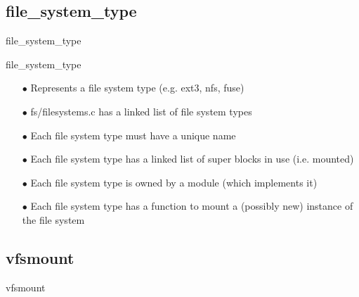 \documentclass{beamer}
\begin{document}
\subsection{file\_system\_type}

\begin{frame}{file\_system\_type}
	
	
\end{frame}

\begin{frame}{file\_system\_type}
	
	\begin{itemize}[<+->]
	
		\item[$\bullet$]{Represents a file system type (e.g. ext3, nfs, fuse)}
		\item[$\bullet$]{fs/filesystems.c has a linked list of file system types}
		\item[$\bullet$]{Each file system type must have a unique name}
		\item[$\bullet$]{Each file system type has a linked list of super blocks in use (i.e. mounted)}		
		\item[$\bullet$]{Each file system type is owned by a module (which implements it)}
		\item[$\bullet$]{Each file system type has a function to mount a (possibly new) instance of the file system}
		
	\end{itemize}

\end{frame}

\subsection{vfsmount}

\begin{frame}{vfsmount}
	
	
\end{frame}
\end{document}
